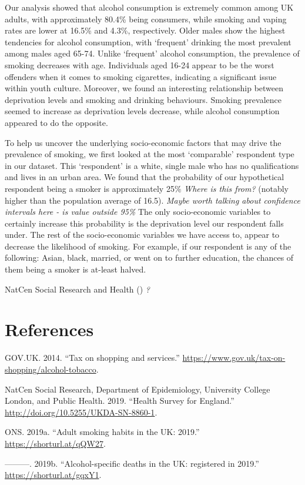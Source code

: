 \documentclass[
  11pt,
]{article}
\newlength{\cslhangindent}
\newenvironment{CSLReferences}[2] %
 {\begin{list}{}{%
  \setlength{\itemindent}{0pt}
  \setlength{\leftmargin}{0pt}
  \setlength{\parsep}{0pt}
  \ifodd #1
   \setlength{\leftmargin}{\cslhangindent}
   \setlength{\itemindent}{-1\cslhangindent}
  \fi
  \setlength{\itemsep}{#2\baselineskip}}}
 {\end{list}}
\begin{document}
Our analysis showed that alcohol consumption is extremely common among
UK adults, with approximately 80.4\% being consumers, while smoking and
vaping rates are lower at 16.5\% and 4.3\%, respectively. Older males
show the highest tendencies for alcohol consumption, with `frequent'
drinking the most prevalent among males aged 65-74. Unlike `frequent'
alcohol consumption, the prevalence of smoking decreases with age.
Individuals aged 16-24 appear to be the worst offenders when it comes to
smoking cigarettes, indicating a significant issue within youth culture.
Moreover, we found an interesting relationship between deprivation
levels and smoking and drinking behaviours. Smoking prevalence seemed to
increase as deprivation levels decrease, while alcohol consumption
appeared to do the opposite.

To help us uncover the underlying socio-economic factors that may drive
the prevalence of smoking, we first looked at the most `comparable'
respondent type in our dataset. This `respondent' is a white, single
male who has no qualifications and lives in an urban area. We found that
the probability of our hypothetical respondent being a smoker is
approximately 25\% \emph{Where is this from?} (notably higher than the
population average of 16.5). \emph{Maybe worth talking about confidence
intervals here - is value outside 95\%} The only socio-economic
variables to certainly increase this probability is the deprivation
level our respondent falls under. The rest of the socio-economic
variables we have access to, appear to decrease the likelihood of
smoking. For example, if our respondent is any of the following: Asian,
black, married, or went on to further education, the chances of them
being a smoker is at-least halved.

NatCen Social Research and Health () \emph{?}

\newpage

\section*{References}\label{references}

\label{refs}
\begin{CSLReferences}{1}{0}
GOV.UK. 2014. {``{Tax on shopping and services}.''}
\url{https://www.gov.uk/tax-on-shopping/alcohol-tobacco}.

NatCen Social Research, Department of Epidemiology, University College
London, and Public Health. 2019. {``{Health Survey for England}.''}
\url{http://doi.org/10.5255/UKDA-SN-8860-1}.

ONS. 2019a. {``{Adult smoking habits in the UK: 2019}.''}
\url{https://shorturl.at/qQW27}.

---------. 2019b. {``{Alcohol-specific deaths in the UK: registered in
2019}.''} \url{https://shorturl.at/gqxY1}.

\end{CSLReferences}
\end{document}

